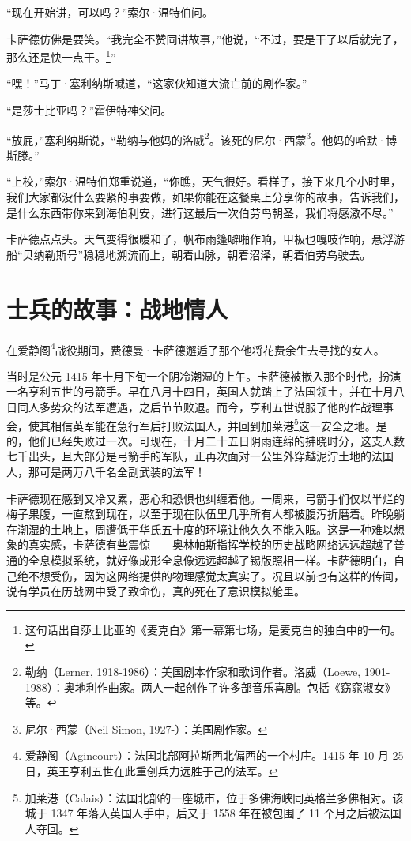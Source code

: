 \documentclass[AutoFakeBold=true]{book}
\begin{document}
``现在开始讲，可以吗？''索尔·温特伯问。

卡萨德仿佛是要笑。``我完全不赞同讲故事，''他说，``不过，要是干了以后就完了，那么还是快一点干。\footnote{这句话出自莎士比亚的《麦克白》第一幕第七场，是麦克白的独白中的一句。}''

``嘿！''马丁·塞利纳斯喊道，``这家伙知道大流亡前的剧作家。''

``是莎士比亚吗？''霍伊特神父问。

``放屁，''塞利纳斯说，``勒纳与他妈的洛威\footnote{勒纳（Lerner, 1918-1986）：美国剧本作家和歌词作者。洛威（Loewe, 1901-1988）：奥地利作曲家。两人一起创作了许多部音乐喜剧。包括《窈窕淑女》等。}。该死的尼尔·西蒙\footnote{尼尔·西蒙（Neil Simon, 1927-）：美国剧作家。}。他妈的哈默·博斯滕。''

``上校，''索尔·温特伯郑重说道，``你瞧，天气很好。看样子，接下来几个小时里，我们大家都没什么要紧的事要做，如果你能在这餐桌上分享你的故事，告诉我们，是什么东西带你来到海伯利安，进行这最后一次伯劳鸟朝圣，我们将感激不尽。''

卡萨德点点头。天气变得很暖和了，帆布雨篷噼啪作响，甲板也嘎吱作响，悬浮游船``贝纳勒斯号''稳稳地溯流而上，朝着山脉，朝着沼泽，朝着伯劳鸟驶去。

\section{士兵的故事：战地情人}

在爱静阁\footnote{爱静阁（Agincourt）：法国北部阿拉斯西北偏西的一个村庄。1415 年 10 月 25 日，英王亨利五世在此重创兵力远胜于己的法军。}战役期间，费德曼·卡萨德邂逅了那个他将花费余生去寻找的女人。

当时是公元 1415 年十月下旬一个阴冷潮湿的上午。卡萨德被嵌入那个时代，扮演一名亨利五世的弓箭手。早在八月十四日，英国人就踏上了法国领土，并在十月八日同人多势众的法军遭遇，之后节节败退。而今，亨利五世说服了他的作战理事会，使其相信英军能在急行军后打败法国人，并回到加莱港\footnote{加莱港（Calais）：法国北部的一座城市，位于多佛海峡同英格兰多佛相对。该城于 1347 年落入英国人手中，后又于 1558 年在被包围了 11 个月之后被法国人夺回。}这一安全之地。是的，他们已经失败过一次。可现在，十月二十五日阴雨连绵的拂晓时分，这支人数七千出头，且大部分是弓箭手的军队，正再次面对一公里外穿越泥泞土地的法国人，那可是两万八千名全副武装的法军！

卡萨德现在感到又冷又累，恶心和恐惧也纠缠着他。一周来，弓箭手们仅以半烂的梅子果腹，一直熬到现在，以至于现在队伍里几乎所有人都被腹泻折磨着。昨晚躺在潮湿的土地上，周遭低于华氏五十度的环境让他久久不能入眠。这是一种难以想象的真实感，卡萨德有些震惊——奥林帕斯指挥学校的历史战略网络远远超越了普通的全息模拟系统，就好像成形全息像远远超越了锡版照相一样。卡萨德明白，自己绝不想受伤，因为这网络提供的物理感觉太真实了。况且以前也有这样的传闻，说有学员在历战网中受了致命伤，真的死在了意识模拟舱里。
\end{document}
